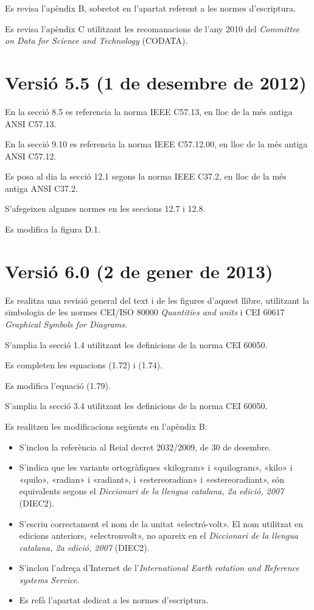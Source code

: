 Es revisa l'apèndix B, sobretot en l'apartat referent a les normes d'escriptura.

Es revisa l'apèndix C utilitzant les recomanacions de l'any 2010 del \textit{Committee on Data for Science and Technology} (CODATA).

\section*{Versió 5.5 (1 de desembre de 2012)}

En la secció 8.5 es referencia la norma  IEEE C57.13, en lloc de la més antiga ANSI C57.13.

En la secció 9.10 es referencia la norma  IEEE C57.12.00, en lloc de la més antiga ANSI C57.12.

Es posa al dia la secció 12.1 segons la norma IEEE C37.2, en lloc de la més antiga ANSI C37.2.

S'afegeixen algunes normes en les seccions 12.7 i 12.8.

Es modifica  la figura D.1.


\section*{Versió 6.0 (2 de gener de 2013)}

Es realitza una revisió general del text i de les figures d'aquest  llibre, utilitzant la simbologia de les normes CEI/ISO 80000  \textit{Quantities and units} i  CEI 60617  \textit{Graphical Symbols for Diagrams}.

S'amplia la secció 1.4 utilitzant les definicions de la norma CEI 60050.

Es completen les equacions (1.72) i (1.74).

Es modifica l'equació (1.79).

S'amplia la secció  3.4 utilitzant les definicions de la norma CEI 60050.

Es realitzen les modificacions següents en l'apèndix B:
\begin{itemize}
   \item  S'inclou la referència al Reial decret 2032/2009, de 30 de desembre.
   \item S'indica que les variants ortogràfiques  «kilogram»
    i «quilogram», «kilo» i «quilo», «radian» i «radiant», i
   «estereoradian» i «estereoradiant», són equivalents segons el   \textit{Diccionari de la llengua catalana, 2a edició, 2007} (DIEC2).
    \item S'escriu correctament el nom de la unitat «electró-volt». El nom  utilitzat en edicions anteriors,   «electronvolt», no apareix en el \textit{Diccionari de la llengua catalana, 2a edició, 2007} (DIEC2).
    \item S'inclou l'adreça d'Internet de l'\textit{International Earth rotation and Reference systems Service}.
     \item Es refà l'apartat dedicat a les normes d'escriptura.
\end{itemize}


